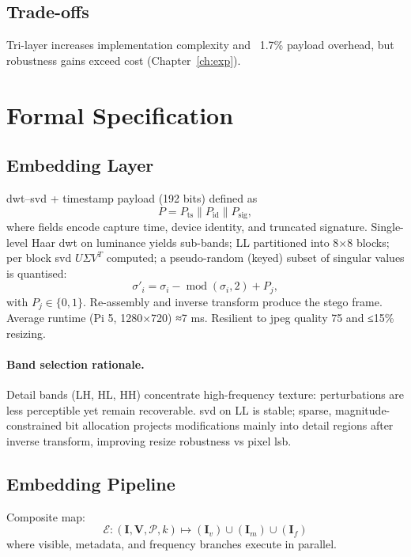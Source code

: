 \subsection{Trade-offs}\label{subsec:trade-offs}
Tri-layer increases implementation complexity and ~1.7\% payload overhead, but robustness gains exceed cost (Chapter~\ref{ch:exp}).

\section{Formal Specification}
\label{sec:deep_dive:spec}

\subsection{Embedding Layer}
\label{subsec:embedding-layer}
\gls{dwt}–\gls{svd} + timestamp payload (192 bits) defined as
\begin{equation}
  P = P_{\text{ts}} \parallel P_{\text{id}} \parallel P_{\text{sig}},
  \label{eq:p_payload}
\end{equation}
where fields encode capture time, device identity, and truncated signature.
Single-level Haar \gls{dwt} on luminance yields sub-bands; LL partitioned into 8×8 blocks; per block \gls{svd} $U\Sigma V^T$ computed; a pseudo-random (keyed) subset of singular values is quantised:
\begin{equation}
  \sigma'_i = \sigma_i - \operatorname{mod}(\sigma_i,2) + P_j,
  \label{eq:svd_quant}
\end{equation}
with $P_j\in\{0,1\}$.
Re-assembly and inverse transform produce the stego frame.
Average runtime (Pi 5, 1280×720) ≈7 ms.
Resilient to \gls{jpeg} quality 75 and ≤15\% resizing.

\paragraph{Band selection rationale.} Detail bands (LH, HL, HH) concentrate high-frequency texture: perturbations are less perceptible yet remain recoverable. \gls{svd} on LL is stable; sparse, magnitude-constrained bit allocation projects modifications mainly into detail regions after inverse transform, improving resize robustness vs pixel \gls{lsb}.

\subsection{Embedding Pipeline}\label{subsec:embedding-pipeline}
Composite map:
\begin{equation}
  \label{eq:embed}
  \mathcal E: (\mathbf I, \mathbf V, \mathcal P, k) \mapsto (\mathbf I_v) \cup (\mathbf I_m) \cup (\mathbf I_f)
\end{equation}
where visible, metadata, and frequency branches execute in parallel.

